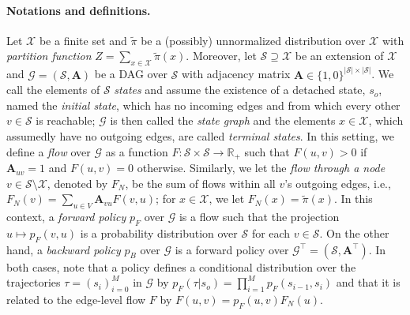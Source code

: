 \documentclass{article}
\theoremstyle{plain}
\theoremstyle{definition}
\theoremstyle{remark}
\theoremstyle{remark}
\begin{document}
\paragraph{Notations and definitions.} Let $\mathcal{X}$ be a finite set and $\tilde{\pi}$ be a (possibly) unnormalized distribution over $\mathcal{X}$ with \textit{partition function} $Z = \sum_{x \in \mathcal{X}} \tilde{\pi}(x)$. Moreover, let $\mathcal{S} \supseteq \mathcal{X}$ be an extension of $\mathcal{X}$ and $\mathcal{G} = (\mathcal{S}, \mathbf{A})$ be a DAG over $\mathcal{S}$ with adjacency matrix $\mathbf{A} \in \{1, 0\}^{|\mathcal{S}| \times |\mathcal{S}|}$. We call the elements of $\mathcal{S}$ \textit{states} and assume the existence of a detached state, $s_{o}$, named the \textit{initial state}, which has no incoming edges and from which every other $v \in \mathcal{S}$ is reachable; $\mathcal{G}$ is then called the \textit{state graph} and the elements $x \in \mathcal{X}$, which assumedly have no outgoing edges, are called \textit{terminal states}. In this setting, we define a \textit{flow} over $\mathcal{G}$ as a function $F \colon \mathcal{S} \times \mathcal{S} \rightarrow \mathbb{R}_{+}$ such that $F(u, v) > 0$ if $\mathbf{A}_{uv} = 1$ and $F(u, v) = 0$ otherwise. Similarly, we let the \textit{flow through a node} $v \in \mathcal{S} \setminus \mathcal{X}$, denoted by $F_{N}$, be the sum of flows within all $v$'s outgoing edges, i.e., $F_{N}(v) = \sum_{u \in V} \mathbf{A}_{vu} F(v, u)$; for $x \in \mathcal{X}$, we let $F_{N}(x) = \tilde{\pi}(x)$. In this context, a \textit{forward policy} $p_{F}$ over $\mathcal{G}$ is a flow such that the projection $u \mapsto p_{F}(v, u)$ is a probability distribution over $\mathcal{S}$ for each $v \in \mathcal{S}$. On the other hand, a \textit{backward policy} $p_{B}$ over $\mathcal{G}$ is a forward policy over $\mathcal{G}^{\intercal} = (\mathcal{S}, \mathbf{A}^{\intercal})$. In both cases, note that a policy defines a conditional distribution over the trajectories $\tau = (s_{i})_{i=0}^{M}$ in $\mathcal{G}$ by $p_{F}(\tau | s_{o}) = \prod_{i=1}^{M} p_{F}(s_{i - 1}, s_{i})$ and that it is related to the edge-level flow $F$ by $F(u, v) = p_{F}(u, v) F_{N}(u)$.  
\end{document}
